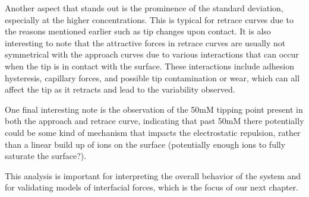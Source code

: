 Another aspect that stands out is the prominence of the standard deviation, especially at the higher concentrations. This is typical for retrace curves due to the reasons mentioned earlier such as tip changes upon contact. It is also interesting to note that the attractive forces in retrace curves are usually not symmetrical with the approach curves due to various interactions that can occur when the tip is in contact with the surface. These interactions include adhesion hysteresis, capillary forces, and possible tip contamination or wear, which can all affect the tip as it retracts and lead to the variability observed.

One final interesting note is the observation of the 50mM tipping point present in both the approach and retrace curve, indicating that past 50mM there potentially could be some kind of mechanism that impacts the electrostatic repulsion, rather than a linear build up of ions on the surface (potentially enough ions to fully saturate the surface?).

This analysis is important for interpreting the overall behavior of the system and for validating models of interfacial forces, which is the focus of our next chapter.